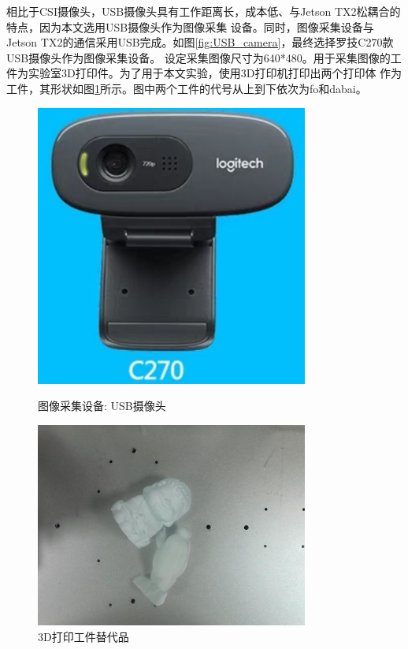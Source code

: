 相比于CSI摄像头，USB摄像头具有工作距离长，成本低、与Jetson TX2松耦合的特点，因为本文选用USB摄像头作为图像采集
设备。同时，图像采集设备与Jetson TX2的通信采用USB完成。如图\ref{fig:USB_camera}，最终选择罗技C270款USB摄像头作为图像采集设备。
设定采集图像尺寸为640*480。用于采集图像的工件为实验室3D打印件。为了用于本文实验，使用3D打印机打印出两个打印体
作为工件，其形状如图\ref{fig:printer}所示。图中两个工件的代号从上到下依次为fo和dabai。

\begin{figure}[h]
    \begin{minipage}[t]{0.45\textwidth}
        \centering
        \includegraphics[width=0.8\textwidth, height=0.6\textwidth]{pic/chap2/USB_camera.jpg}
        \caption{图像采集设备: USB摄像头}
        \label{fig:USB_camera}
    \end{minipage}
    \begin{minipage}[t]{0.45\textwidth}
        \centering
        \includegraphics[width=0.8\textwidth]{pic/chap2/printer.jpg}
        \caption{3D打印工件替代品}
        \label{fig:printer}
    \end{minipage}
\end{figure}

